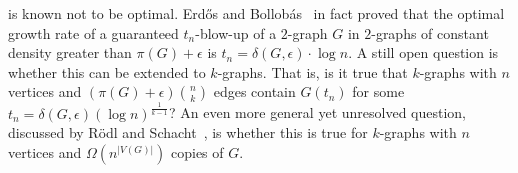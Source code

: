  is known not to be optimal.
Erdős and Bollobás~\cite{bollobas1973structure} in fact proved that the optimal growth
rate of a guaranteed $t_n$-blow-up of a $2$-graph $G$ in $2$-graphs of constant density greater than $\pi(G) + \epsilon$ is
$t_n = \delta(G, \epsilon) \cdot \log n$.
A still open question is whether this can be extended to $k$-graphs.
That is, is it true that $k$-graphs with $n$ vertices and  $\left(\pi(G) + \epsilon \right)  \binom{n}{k}$ edges
contain $G(t_n)$ for some $t_n = \delta(G, \epsilon) (\log n)^{\frac{1}{k-1}}$?
An even more general yet unresolved question, discussed by Rödl and Schacht~\cite{rodl2012complete}, is whether this is true for
$k$-graphs with $n$ vertices and $\Omega (n^{|V(G)|})$ copies of $G$.
